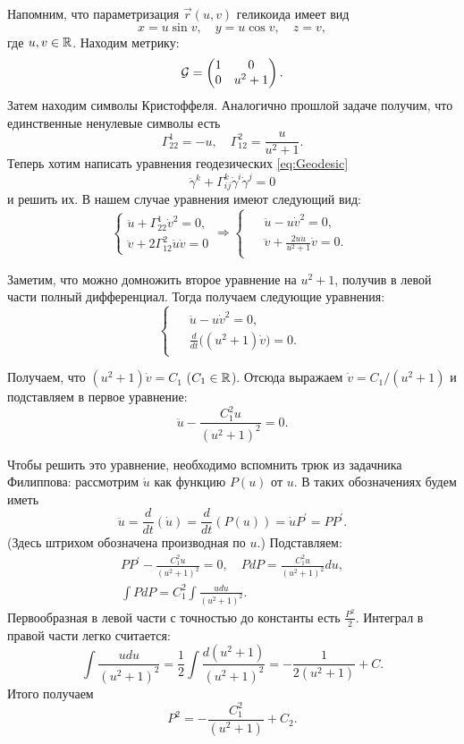 \begin{solution}
	Напомним, что параметризация $\vec{r}(u, v)$ геликоида имеет вид
	\[
		x = u\sin v,\quad y = u\cos v,\quad z = v,
	\]
	где $u, v \in \mathbb{R}$. Находим метрику:
	\[
		\mathcal{G} =
		\begin{pmatrix}
			1 & 0\\
			0 & u^2 + 1
		\end{pmatrix}.
	\]
	Затем находим символы Кристоффеля. Аналогично прошлой задаче получим, что единственные ненулевые символы есть
	\[
		\Gamma_{22}^1 = -u,\quad \Gamma_{12}^2 = \frac{u}{u^2 + 1}.
	\]
	Теперь хотим написать уравнения геодезических \eqref{eq:Geodesic}
	\[
		\ddot{\gamma}^k + \Gamma_{ij}^k\dot{\gamma}^i\dot{\gamma}^j = 0
	\]
	и решить их. В нашем случае уравнения имеют следующий вид:
	\[
		\begin{cases}
			\ddot{u} + \Gamma_{22}^1\dot{v}^2 = 0,\\
			\ddot{v} + 2\Gamma_{12}^2\dot{u}\dot{v} = 0
		\end{cases} \Rightarrow
		\begin{cases}
			\begin{aligned}
				&\ddot{u} - u\dot{v}^2 = 0,\\
				&\ddot{v} + \frac{2u\dot{u}}{u^2 + 1}\dot{v} = 0.
			\end{aligned}
		\end{cases}
	\]

	Заметим, что можно домножить второе уравнение на $u^2 + 1$, получив в левой части полный дифференциал. Тогда получаем следующие уравнения:
	\[
		\begin{cases}
			\begin{aligned}
				&\ddot{u} - u\dot{v}^2 = 0,\\
				&\frac{d}{dt}\big((u^2 + 1)\dot{v}\big) = 0.
			\end{aligned}
		\end{cases}
	\]

	Получаем, что $(u^2 + 1)\dot{v} = C_1$ ($C_1 \in \mathbb{R}$). Отсюда выражаем $\dot{v} = C_1 / (u^2 + 1)$ и подставляем в первое уравнение:
	\[
		\ddot{u} - \frac{C_1^2u}{(u^2 + 1)^2} = 0.
	\]

	Чтобы решить это уравнение, необходимо вспомнить трюк из задачника Филиппова: рассмотрим $\dot{u}$ как функцию $P(u)$ от $u$. В таких обозначениях будем иметь
	\[
		\ddot{u} = \frac{d}{dt}(\dot{u}) = \frac{d}{dt}(P(u)) = \dot{u}P^\prime = PP^\prime.
	\]
	(Здесь штрихом обозначена производная по $u$.) Подставляем:
	\begin{gather*}
		PP^\prime - \frac{C_1^2u}{(u^2 + 1)^2} = 0,\quad PdP = \frac{C_1^2u}{(u^2 + 1)^2}du,\\
		\int PdP = C_1^2\int\frac{udu}{(u^2 + 1)^2}.
	\end{gather*}
	Первообразная в левой части с точностью до константы есть $\frac{P^2}{2}$. Интеграл в правой части легко считается:
	\[
		\int\frac{udu}{(u^2 + 1)^2} = \frac{1}{2}\int\frac{d(u^2 + 1)}{(u^2 + 1)^2} = -\frac{1}{2(u^2 + 1)} + C.
	\]
	Итого получаем
	\[
		P^2 = -\frac{C_1^2}{(u^2 + 1)} + C_2.
	\]


\end{solution}
